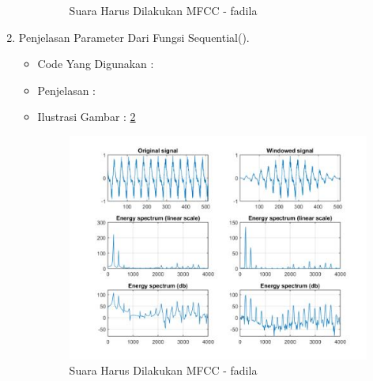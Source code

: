 \begin{enumerate}
\begin{itemize}
\begin{figure}[!hbtp]
\caption{Suara Harus Dilakukan MFCC - fadila}
\label{suara-mfcc-fadila}
\end{figure}
\par
\end{itemize}
\par
\par
\par
\par
\par
\par
\par
\par
\item Penjelasan Parameter Dari Fungsi Sequential().
\begin{itemize}
\item Code Yang Digunakan :
\par

\par
\item Penjelasan :
\par
\item Ilustrasi Gambar : \ref{suara-mfcc-fadila}
\par
\begin{figure}[!hbtp]
\centering
\includegraphics[scale=0.2]{figures/suara-mfcc-fadila.jpg}
\caption{Suara Harus Dilakukan MFCC - fadila}
\label{suara-mfcc-fadila}
\end{figure}
\par
\end{itemize}
\par
\par
\par
\par

\end{enumerate}
